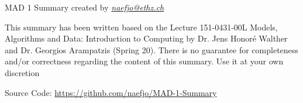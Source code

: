 



\maketitle
\begin{center}
MAD 1 Summary created by \href{mailto:naefjo@ethz.ch}{\textit{naefjo@ethz.ch}}\\
\parbox{0.5\linewidth}{
\begin{center}
This summary has been written based on the Lecture 151-0431-00L Models, Algorithms and Data: Introduction to Computing by Dr. Jens Honoré Walther and Dr. Georgios Arampatzis (Spring 20). There is no guarantee for completeness and/or correctness regarding the content of this summary. Use it at your own discretion

Source Code: \url{https://github.com/naefjo/MAD-1-Summary}
\end{center}
}
\end{center}
\newpage

\begin{center}
    \begin{multicols*}{2}
        \tableofcontents
    \end{multicols*}
\end{center}

